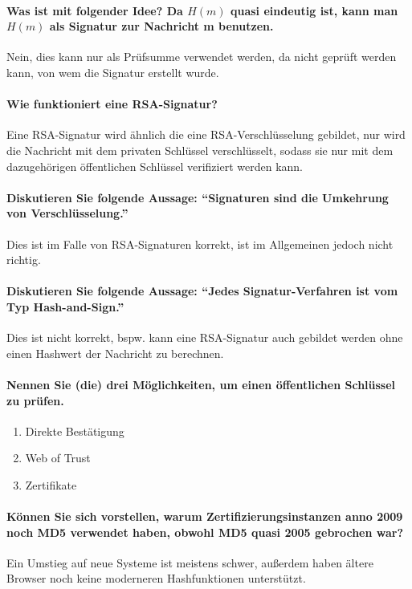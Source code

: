 		\paragraph{Was ist mit folgender Idee? Da \(H(m)\) quasi eindeutig ist, kann man \(H(m)\) als Signatur zur Nachricht m benutzen.}
			Nein, dies kann nur als Prüfsumme verwendet werden, da nicht geprüft werden kann, von wem die Signatur erstellt wurde.

		\paragraph{Wie funktioniert eine RSA-Signatur?}
			Eine RSA-Signatur wird ähnlich die eine RSA-Verschlüsselung gebildet, nur wird die Nachricht mit dem privaten Schlüssel verschlüsselt, sodass sie nur mit dem dazugehörigen öffentlichen Schlüssel verifiziert werden kann.

		\paragraph{Diskutieren Sie folgende Aussage: \enquote{Signaturen sind die Umkehrung von Verschlüsselung.}}
			Dies ist im Falle von RSA-Signaturen korrekt, ist im Allgemeinen jedoch nicht richtig.

		\paragraph{Diskutieren Sie folgende Aussage: \enquote{Jedes Signatur-Verfahren ist vom Typ Hash-and-Sign.}}
			Dies ist nicht korrekt, bspw. kann eine RSA-Signatur auch gebildet werden ohne einen Hashwert der Nachricht zu berechnen.

		\paragraph{Nennen Sie (die) drei Möglichkeiten, um einen öffentlichen Schlüssel zu prüfen.}
			\begin{enumerate}
				\item Direkte Bestätigung
				\item Web of Trust
				\item Zertifikate
			\end{enumerate}

		\paragraph{Können Sie sich vorstellen, warum Zertifizierungsinstanzen anno 2009 noch MD5 verwendet haben, obwohl MD5 quasi 2005 gebrochen war?}
			Ein Umstieg auf neue Systeme ist meistens schwer, außerdem haben ältere Browser noch keine moderneren Hashfunktionen unterstützt.


